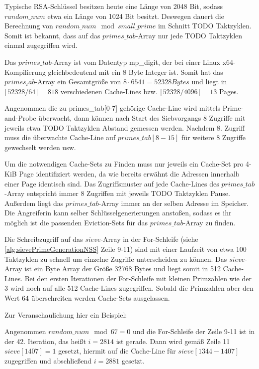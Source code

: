 Typische RSA-Schlüssel besitzen heute eine Länge von 2048 Bit, sodass $random\_num$ etwa ein Länge von 1024 Bit besitzt.
Deswegen dauert die Berechnung von $random\_num \mod small\_prime$ im Schnitt TODO Taktzyklen.
Somit ist bekannt, dass auf das $primes\_tab$-Array nur jede TODO Taktzyklen einmal zugegriffen wird.

Das $primes\_tab$-Array ist vom Datentyp mp_digit, der bei einer Linux x64-Kompilierung gleichbedeutend mit ein 8 Byte Integer ist.
Somit hat das $primes_tab$-Array ein Gesamtgröße von $8 \cdot 6541 = 52328 Bytes$ und liegt in $\lceil 52328 / 64 \rceil = 818$ verschiedenen Cache-Lines bzw. $\lceil 52328 / 4096 \rceil = 13$ Pages.

Angenommen die zu primes_tab[0-7] gehörige Cache-Line wird mittels Prime-and-Probe überwacht, dann können nach Start des Siebvorgangs 8 Zugriffe mit jeweils etwa TODO Taktzyklen Abstand gemessen werden.
Nachdem 8. Zugriff muss die überwachte Cache-Line auf $primes\_tab[8-15]$ für weitere 8 Zugriffe gewechselt werden usw.

Um die notwendigen Cache-Sets zu Finden muss nur jeweils ein Cache-Set pro 4-KiB Page identifiziert werden, da wie bereits erwähnt die Adressen innerhalb einer Page identisch sind.
Das Zugriffsmuster auf jede Cache-Lines des $primes\_tab$-Array entspricht immer 8 Zugriffen mit jeweils TODO Taktzyklen Pause. Außerdem liegt das $primes\_tab$-Array immer an der selben Adresse im Speicher.
Die Angreiferin kann selber Schlüsselgenerierungen anstoßen, sodass es ihr möglich ist die passenden Eviction-Sets für das $primes\_tab$-Array zu finden.

Die Schreibzugriff auf das $sieve$-Array in der For-Schleife (siehe \ref{alg:sievePrimeGenerationNSS} Zeile 9-11) sind mit einer Laufzeit von etwa 100 Taktzyklen zu schnell um einzelne Zugriffe unterscheiden zu können.
Das $sieve$-Array ist ein Byte Array der Größe 32768 Bytes und liegt somit in 512 Cache-Lines.
Bei den ersten Iterationen der For-Schleife mit kleinen Primzahlen wie der 3 wird noch auf alle 512 Cache-Lines zugegriffen.
Sobald die Primzahlen aber den Wert 64 überschreiten werden Cache-Sets ausgelassen.

Zur Veranschaulichung hier ein Beispiel:

Angenommen $random\_num \mod 67 = 0$ und die For-Schleife der Zeile 9-11 ist in der 42. Iteration, das heißt $i=2814$ ist gerade.
Dann wird gemäß Zeile 11 $sieve[1407] = 1$ gesetzt, hiermit auf die Cache-Line für $sieve[1344-1407]$ zugegriffen und abschließend $i=2881$ gesetzt.

